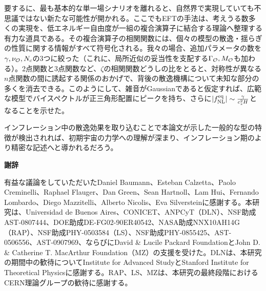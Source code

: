 要するに、最も基本的な単一場シナリオを離れると、自然界で実現していても不思議ではない新たな可能性が開かれる。ここでもEFTの手法は、考えうる数多くの実現を、低エネルギー自由度が一組の複合演算子に結合する理論へ整理する有力な道具である。その複合演算子の相関関数には、個々の模型の散逸・揺らぎの性質に関する情報がすべて符号化される。我々の場合、追加パラメータの数を$\gamma,\nu_{{\cal O}},N_c$の3つに絞った（これに、局所近似の妥当性を支配する$\Gamma_{\cal O},M_{\cal O}$も加わる）。2点関数と3点関数など、$\zeta$の相関関数どうしの比をとると、対称性が異なる$n$点関数の間に誘起する関係のおかげで、背後の散逸機構について未知な部分の多くを消去できる。このようにして、雑音がGaussianであると仮定すれば、広範な模型でバイスペクトルが正三角形配置にピークを持ち、さらに$|f_{\rm NL}^{\rm eq}|\sim\frac{\gamma}{c_s^2H}$となることを示せた。

インフレーション中の散逸効果を取り込むことで本論文が示した一般的な型の特徴が検出されれば、初期宇宙の力学への理解が深まり、インフレーション期のより精密な記述へと導かれるだろう。

\clearpage
\begin{center}
{\bf 謝辞}
\end{center}
有益な議論をしていただいたDaniel Baumann、Esteban Calzetta、Paolo Creminelli、Raphael Flauger、Dan Green、Sean Hartnoll、Lam Hui、Fernando Lombardo、Diego Mazzitelli、Alberto Nicolis、Eva Silversteinに感謝する。本研究は、Universidad de Buenos Aires、CONICET、ANPCyT（DLN）、NSF助成AST-0807444、DOE助成DE-FG02-90ER40542、NASA助成NNX10AH14G（RAP）、NSF助成PHY-0503584（LS）、NSF助成PHY-0855425、AST-0506556、AST-0907969、ならびにDavid \& Lucile Packard FoundationとJohn D. \& Catherine T. MacArthur Foundation（MZ）の支援を受けた。DLNは、本研究の期間中の歓待についてInstitute for Advanced StudyとStanford Institute for Theoretical Physicsに感謝する。RAP、LS、MZは、本研究の最終段階におけるCERN理論グループの歓待に感謝する。

